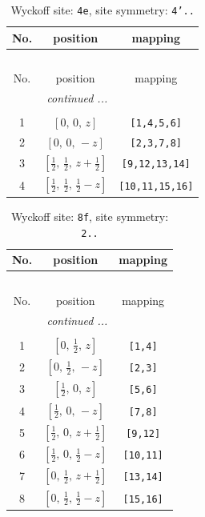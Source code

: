 \documentclass[fleqn,8pt]{jsarticle}
\begin{document}
\renewcommand{\arraystretch}{1.2}
\begin{longtable}{ccc}
\caption{Wyckoff site: {\tt 4e}, site symmetry: {\tt 4'..}}
 \\
 \hline \hline
No. & position & mapping \\ \hline \endfirsthead

\multicolumn{2}{l}{\tablename\ \thetable{}} \\
 \hline \hline
No. & position & mapping \\ \hline \endhead

 \hline \hline
\multicolumn{2}{r}{\footnotesize\it continued ...} \\ \endfoot

 \hline \hline
\multicolumn{2}{r}{} \\ \endlastfoot

1 & $\left[ 0,\, 0,\, z \right]$ & {\tt [1,4,5,6]} \\ \hline
2 & $\left[ 0,\, 0,\, - z \right]$ & {\tt [2,3,7,8]} \\ \hline
3 & $\left[ \frac{1}{2},\, \frac{1}{2},\, z + \frac{1}{2} \right]$ & {\tt [9,12,13,14]} \\ \hline
4 & $\left[ \frac{1}{2},\, \frac{1}{2},\, \frac{1}{2} - z \right]$ & {\tt [10,11,15,16]} \\
\end{longtable}
\renewcommand{\arraystretch}{1.2}
\begin{longtable}{ccc}
\caption{Wyckoff site: {\tt 8f}, site symmetry: {\tt 2..}}
 \\
 \hline \hline
No. & position & mapping \\ \hline \endfirsthead

\multicolumn{2}{l}{\tablename\ \thetable{}} \\
 \hline \hline
No. & position & mapping \\ \hline \endhead

 \hline \hline
\multicolumn{2}{r}{\footnotesize\it continued ...} \\ \endfoot

 \hline \hline
\multicolumn{2}{r}{} \\ \endlastfoot

1 & $\left[ 0,\, \frac{1}{2},\, z \right]$ & {\tt [1,4]} \\ \hline
2 & $\left[ 0,\, \frac{1}{2},\, - z \right]$ & {\tt [2,3]} \\ \hline
3 & $\left[ \frac{1}{2},\, 0,\, z \right]$ & {\tt [5,6]} \\ \hline
4 & $\left[ \frac{1}{2},\, 0,\, - z \right]$ & {\tt [7,8]} \\ \hline
5 & $\left[ \frac{1}{2},\, 0,\, z + \frac{1}{2} \right]$ & {\tt [9,12]} \\ \hline
6 & $\left[ \frac{1}{2},\, 0,\, \frac{1}{2} - z \right]$ & {\tt [10,11]} \\ \hline
7 & $\left[ 0,\, \frac{1}{2},\, z + \frac{1}{2} \right]$ & {\tt [13,14]} \\ \hline
8 & $\left[ 0,\, \frac{1}{2},\, \frac{1}{2} - z \right]$ & {\tt [15,16]} \\
\end{longtable}
\end{document}
